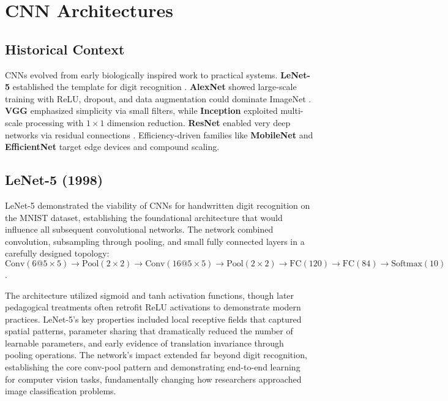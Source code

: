 
\section{CNN Architectures }
\label{sec:cnn-architectures}

\subsection*{Historical Context}
CNNs evolved from early biologically inspired work to practical systems. \textbf{LeNet-5} established the template for digit recognition \cite{LeCun1989}. \textbf{AlexNet} showed large-scale training with ReLU, dropout, and data augmentation could dominate ImageNet \cite{Krizhevsky2012}. \textbf{VGG} emphasized simplicity via small filters, while \textbf{Inception} exploited multi-scale processing with $1\times1$ dimension reduction. \textbf{ResNet} enabled very deep networks via residual connections \cite{He2016}. Efficiency-driven families like \textbf{MobileNet} and \textbf{EfficientNet} target edge devices and compound scaling.
\subsection{LeNet-5 (1998)}
\label{subsec:lenet}

LeNet-5 demonstrated the viability of CNNs for handwritten digit recognition on the MNIST dataset, establishing the foundational architecture that would influence all subsequent convolutional networks. The network combined convolution, subsampling through pooling, and small fully connected layers in a carefully designed topology: \(\text{Conv}(6@5\times5)\to\text{Pool}(2\times2)\to\text{Conv}(16@5\times5)\to\text{Pool}(2\times2)\to\text{FC}(120)\to\text{FC}(84)\to\text{Softmax}(10)\).

The architecture utilized sigmoid and tanh activation functions, though later pedagogical treatments often retrofit ReLU activations to demonstrate modern practices. LeNet-5's key properties included local receptive fields that captured spatial patterns, parameter sharing that dramatically reduced the number of learnable parameters, and early evidence of translation invariance through pooling operations. The network's impact extended far beyond digit recognition, establishing the core conv-pool pattern and demonstrating end-to-end learning for computer vision tasks, fundamentally changing how researchers approached image classification problems.\cite{LeCun1989,GoodfellowEtAl2016}

